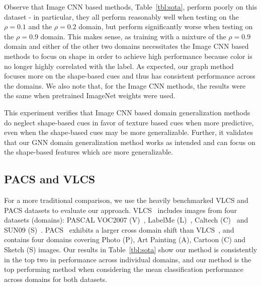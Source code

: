 Observe that Image CNN based methods, Table~\ref{tbl:sota},  perform poorly on this dataset - in particular, they all perform reasonably
well when testing on the $\rho = 0.1$ and the $\rho = 0.2$ domain, but perform
significantly worse when testing on the $\rho = 0.9$ domain. This makes sense, as
training with a mixture of the $\rho = 0.9$ domain and either of the other two
domains necessitates the Image CNN based methods to focus on shape in order to achieve high performance  because color
is no longer highly correlated with the label. As expected, our graph
method focuses more on the shape-based cues and thus has consistent performance
across the domains. We also note that, for the Image CNN methods, the results were the same when pretrained ImageNet weights were used.  




This experiment verifies that Image CNN based domain generalization methods do
neglect shape-based cues in favor of texture based cues when more predictive,
even when the shape-based cues may be more generalizable. Further, it validates
that our GNN domain generalization method works as intended and can focus on the
shape-based features which are more generalizable. 



\subsection{PACS and VLCS} 

For a more traditional comparison, we use the heavily benchmarked VLCS and PACS datasets to evaluate our approach. VLCS~\cite{Fang:etal:ICCV13} includes images from four datasets (domains): PASCAL VOC2007 (V)~\cite{Everingham:etal:IJCV15}, LabelMe (L)~\cite{Russell:etal:IJCV08}, Caltech (C)~\cite{Fei-Fei:Fergus:Perona:CVPRW04} and SUN09 (S)~\cite{Choi:etal:CVPR10}. PACS~\cite{Li:etal:ICCV17} exhibits a larger cross domain shift than VLCS~\cite{Fang:etal:ICCV13}, and contains four domains covering Photo (P), Art Painting (A), Cartoon (C) and Sketch (S) images. Our results in Table~\ref{tbl:sota} show our method is consistently in the top two in performance across individual domains,  and our method is the top performing method when considering the mean classification performance across domains for both datasets. 

